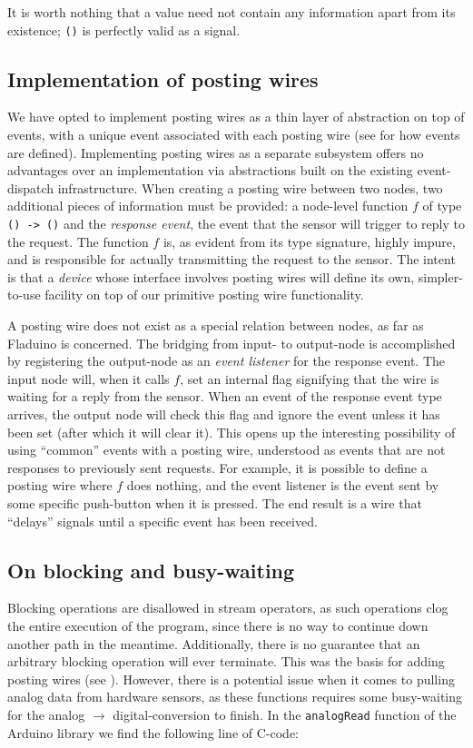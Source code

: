 \documentclass[a4paper, oneside, final]{memoir}
\let\Fref\undefined
\begin{document}
It is worth nothing that a value need not contain any information
apart from its existence; \texttt{()} is perfectly valid as a signal.

\subsection{Implementation of posting wires}
\label{sec:postingwireimpl}
We have opted to implement posting wires as a thin layer of
abstraction on top of events, with a unique event associated with each
posting wire (see \Fref{sec:defining events} for how events are
defined).  Implementing posting wires as a separate subsystem offers
no advantages over an implementation via abstractions built on the
existing event-dispatch infrastructure.  When creating a posting wire
between two nodes, two additional pieces of information must be
provided: a node-level function $f$ of type \texttt{() -> ()} and the
\textit{response event}, the event that the sensor will trigger to
reply to the request.  The function $f$ is, as evident from its type
signature, highly impure, and is responsible for actually transmitting
the request to the sensor.  The intent is that a \textit{device} whose
interface involves posting wires will define its own, simpler-to-use
facility on top of our primitive posting wire functionality.

A posting wire does not exist as a special relation between nodes, as
far as Fladuino is concerned.  The bridging from input- to output-node
is accomplished by registering the output-node as an \textit{event
  listener} for the response event.  The input node will, when it
calls $f$, set an internal flag signifying that the wire is waiting
for a reply from the sensor.  When an event of the response event type
arrives, the output node will check this flag and ignore the event
unless it has been set (after which it will clear it).  This opens up
the interesting possibility of using ``common'' events with a posting
wire, understood as events that are not responses to previously sent
requests.  For example, it is possible to define a posting wire where
$f$ does nothing, and the event listener is the event sent by some
specific push-button when it is pressed.  The end result is a wire
that ``delays'' signals until a specific event has been received.

\subsection{On blocking and busy-waiting}
Blocking operations are disallowed in stream operators, as such
operations clog the entire execution of the program, since there is no
way to continue down another path in the meantime.  Additionally,
there is no guarantee that an arbitrary blocking operation will ever
terminate.  This was the basis for adding posting wires (see
\Fref{sec:posting wires}). However, there is a potential issue when it
comes to pulling analog data from hardware sensors, as these functions
requires some busy-waiting for the analog $\rightarrow$
digital-conversion to finish.  In the \texttt{analogRead} function of
the Arduino library we find the following line of C-code:
\end{document}

